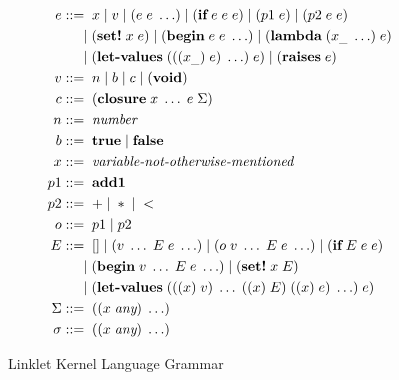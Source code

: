 \begin{figure}[!htbp]
    \centering
    \begin{align*}
        e &::=\; x \;|\; v \;|\; (e\; e\;\ldots) \;|\; (\textbf{if}\; e\; e\; e) \;|\; (p1\; e) \;|\; (p2\; e\; e) \\
          &\;\hspace*{1.3em}|\; (\textbf{set!}\; x\; e) \;|\; (\textbf{begin}\; e\; e\;\ldots) \;|\; (\textbf{lambda}\; (x_{\_}\;\ldots)\; e) \\
          &\;\hspace*{1.3em}|\; (\textbf{let-values}\; (((x_{\_})\; e)\;\ldots)\; e) \;|\; (\textbf{raises}\; e)\\
        v &::=\; n \;|\; b \;|\; c \;|\; (\textbf{void})\\
        c &::=\; (\textbf{closure}\; x\;\ldots\; e\; \Sigma)\\
        n &::=\; \textit{number}\\
        b &::=\; \textbf{true} \;|\; \textbf{false}\\
        x &::=\; \textit{variable-not-otherwise-mentioned}\\
        p1 &::=\; \textbf{add1}\\
        p2 &::=\; + \;|\; * \;|\; <\\
        o &::=\; p1 \;|\; p2\\
        E &::=\; [] \;|\; (v\;\ldots\; E\; e\;\ldots) \;|\; (o\; v\;\ldots\; E\; e\;\ldots) \;|\; (\textbf{if}\; E\; e\; e)\\
          &\;\hspace*{1.3em}|\; (\textbf{begin}\; v\;\ldots\; E\; e\;\ldots) \;|\; (\textbf{set!}\; x\; E) \\
          &\;\hspace*{1.3em}|\; (\textbf{let-values}\; (((x)\; v)\;\ldots\; ((x)\; E)\; ((x)\; e)\;\ldots)\; e)\\
        \Sigma &::=\; ((x\; \textit{any})\;\ldots)\\
        \sigma &::=\; ((x\; \textit{any})\;\ldots)
    \end{align*}

    \vspace{-1em}

    \caption{Linklet Kernel Language Grammar}
\end{figure}

